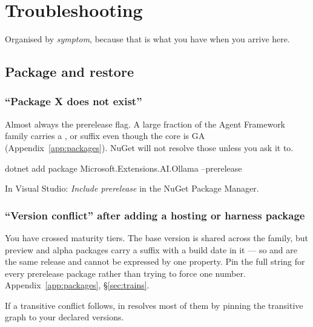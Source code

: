 \chapter{Troubleshooting}
\label{app:troubleshooting}

Organised by \emph{symptom}, because that is what you have when you arrive here.

\section{Package and restore}

\subsection{``Package X does not exist''}

Almost always the prerelease flag. A large fraction of the Agent Framework family
carries a ,  or  suffix even though the core
is GA (Appendix~\ref{app:packages}). NuGet will not resolve those unless you ask
it to.

\begin{shellcmd}
dotnet add package Microsoft.Extensions.AI.Ollama --prerelease
\end{shellcmd}

In Visual Studio: \emph{Include prerelease} in the NuGet Package Manager.

\subsection{``Version conflict'' after adding a hosting or harness package}

You have crossed maturity tiers. The base version is shared across the family,
but preview and alpha packages carry a suffix with a build date in it --- so
\code{\mafcore{}} and \code{\mafpreview{}} are the same release and cannot be
expressed by one property. Pin the full string for every prerelease package
rather than trying to force one number. Appendix~\ref{app:packages},
\S\ref{sec:trains}.

If a transitive conflict follows, 
in  resolves most of them by pinning the
transitive graph to your declared versions.

